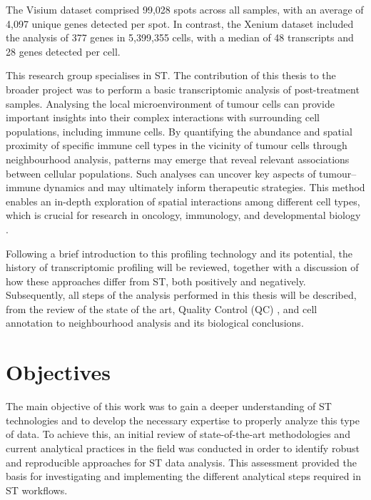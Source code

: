 The Visium dataset comprised 99,028 spots across all samples, with an average of 4,097 unique genes detected per spot. In contrast, the Xenium dataset included the analysis of 377 genes in 5,399,355 cells, with a median of 48 transcripts and 28 genes detected per cell.

This research group specialises in ST. The contribution of this thesis to the broader project was to perform a basic transcriptomic analysis of post-treatment samples. Analysing the local microenvironment of tumour cells can provide important insights into their complex interactions with surrounding cell populations, including immune cells. By quantifying the abundance and spatial proximity of specific immune cell types in the vicinity of tumour cells through neighbourhood analysis, patterns may emerge that reveal relevant associations between cellular populations. Such analyses can uncover key aspects of tumour--immune dynamics and may ultimately inform therapeutic strategies. This method enables an in-depth exploration of spatial interactions among different cell types, which is crucial for research in oncology, immunology, and developmental biology \cite{Aryeh.Silver}.

Following a brief introduction to this profiling technology and its potential, the history of transcriptomic profiling will be reviewed, together with a discussion of how these approaches differ from ST, both positively and negatively. Subsequently, all steps of the analysis performed in this thesis will be described, from the review of the state of the art, Quality Control (QC) , and cell annotation  to neighbourhood analysis  and its biological conclusions.

\section{Objectives}

The main objective of this work was to gain a deeper understanding of ST technologies and to develop the necessary expertise to properly analyze this type of data. To achieve this, an initial review of state-of-the-art methodologies and current analytical practices in the field was conducted in order to identify robust and reproducible approaches for ST data analysis. This assessment provided the basis for investigating and implementing the different analytical steps required in ST workflows. 

